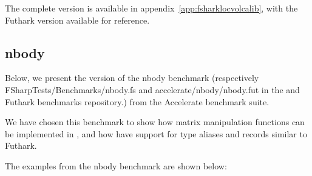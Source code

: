 The complete \fshark{} version is available in
appendix~\ref{app:fsharklocvolcalib}, with the Futhark version available for reference.

\subsection{nbody}
Below, we present the \fshark{} version of the nbody benchmark (respectively
FSharpTests/Benchmarks/nbody.fs and accelerate/nbody/nbody.fut in the
\fshark{} and Futhark benchmarks repository.) from the Accelerate\cite{Accelerate}
benchmark suite.

We have chosen this benchmark to show how matrix manipulation functions can be
implemented in \fshark{}, and how \fshark{} have support for type aliases and
records similar to Futhark.

The examples from the nbody benchmark are shown below:

